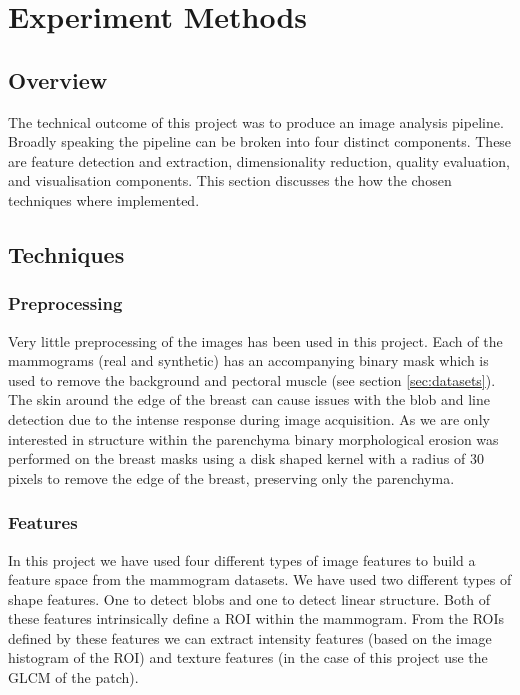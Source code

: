 \chapter{Experiment Methods}

\section{Overview}

The technical outcome of this project was to produce an image analysis pipeline. Broadly speaking the pipeline can be broken into four distinct components. These are feature detection and extraction, dimensionality reduction, quality evaluation, and visualisation components. This section discusses the how the chosen techniques where implemented. 

\section{Techniques}

\subsection{Preprocessing}
Very little preprocessing of the images has been used in this project. Each of the mammograms (real and synthetic) has an accompanying binary mask which is used to remove the background and pectoral muscle (see section \ref{sec:datasets}). The skin around the edge of the breast can cause issues with the blob and line detection due to the intense response during image acquisition. As we are only interested in structure within the parenchyma binary morphological erosion was performed on the breast masks using a disk shaped kernel with a radius of 30 pixels to remove the edge of the breast, preserving only the parenchyma.

\subsection{Features}
\label{sec:experiment-features}
In this project we have used four different types of image features to build a feature space from the mammogram datasets. We have used two different types of shape features. One to detect blobs and one to detect linear structure. Both of these features intrinsically define a ROI within the mammogram. From the ROIs defined by these features we can extract intensity features (based on the image histogram of the ROI) and texture features (in the case of this project use the GLCM of the patch).

